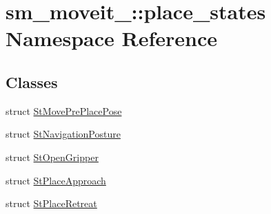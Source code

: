 \hypertarget{namespacesm__moveit__4_1_1place__states}{}\section{sm\+\_\+moveit\+\_\+:\+:place\+\_\+states Namespace Reference}
\label{namespacesm__moveit__4_1_1place__states}
\subsection*{Classes}
\begin{DoxyCompactItemize}
\item 
struct \hyperlink{structsm__moveit__4_1_1place__states_1_1StMovePrePlacePose}{St\+Move\+Pre\+Place\+Pose}
\item 
struct \hyperlink{structsm__moveit__4_1_1place__states_1_1StNavigationPosture}{St\+Navigation\+Posture}
\item 
struct \hyperlink{structsm__moveit__4_1_1place__states_1_1StOpenGripper}{St\+Open\+Gripper}
\item 
struct \hyperlink{structsm__moveit__4_1_1place__states_1_1StPlaceApproach}{St\+Place\+Approach}
\item 
struct \hyperlink{structsm__moveit__4_1_1place__states_1_1StPlaceRetreat}{St\+Place\+Retreat}
\end{DoxyCompactItemize}

